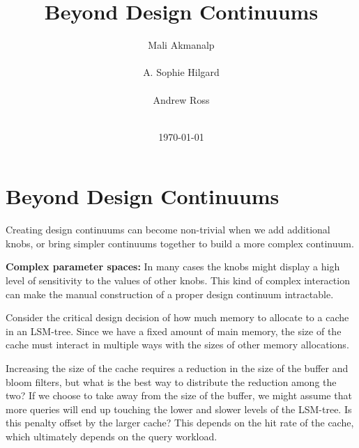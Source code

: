\documentclass{cidr-2019}
\begin{document}
\title{Beyond Design Continuums}

\author{
\alignauthor
Mali Akmanalp\\
       \\
\alignauthor
A. Sophie Hilgard\\
       \\
\alignauthor Andrew Ross\\
       \\
       }

\date{\today}

\maketitle

\section{Beyond Design Continuums}



Creating design continuums can become non-trivial when we add additional knobs,
or bring simpler continuums together to build a more complex continuum.

\textbf{Complex parameter spaces:} In many cases the knobs might display a high
level of sensitivity to the values of other knobs. This kind of complex
interaction can make the manual construction of a proper design continuum
intractable.

Consider the critical design decision of how much memory to allocate to a cache
in an LSM-tree. Since we have a fixed amount of main memory, the size of the
cache must interact in multiple ways with the sizes of other memory
allocations.

Increasing the size of the cache requires a reduction in the size of the
buffer and bloom filters, but what is the best way to distribute the
reduction among the two? If we choose to take away from the size of the
buffer, we might assume that more queries will end up touching the lower and
slower levels of the LSM-tree. Is this penalty offset by the larger cache? This
depends on the hit rate of the cache, which ultimately depends on the query
workload.
\end{document}
